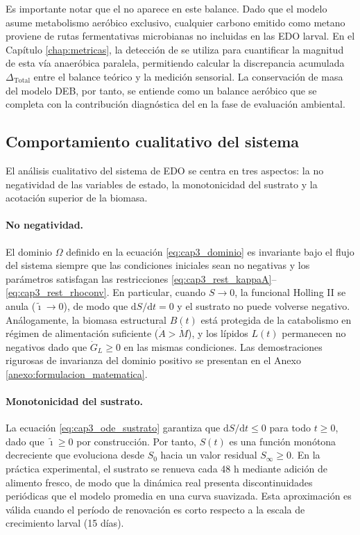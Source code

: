 Es importante notar que el  no aparece en este balance. Dado que el modelo asume metabolismo aeróbico exclusivo, cualquier carbono emitido como metano proviene de rutas fermentativas microbianas no incluidas en las EDO larval. En el Capítulo \ref{chap:metricas}, la detección de  se utiliza para cuantificar la magnitud de esta vía anaeróbica paralela, permitiendo calcular la discrepancia acumulada $\Delta_{\mathrm{Total}}$ entre el balance teórico y la medición sensorial. La conservación de masa del modelo DEB, por tanto, se entiende como un balance aeróbico que se completa con la contribución diagnóstica del  en la fase de evaluación ambiental.

\subsection{Comportamiento cualitativo del sistema}
\label{subsec:cap3_comportamiento}

El análisis cualitativo del sistema de EDO se centra en tres aspectos: la no negatividad de las variables de estado, la monotonicidad del sustrato y la acotación superior de la biomasa.

\paragraph{No negatividad.} El dominio $\Omega$ definido en la ecuación \eqref{eq:cap3_dominio} es invariante bajo el flujo del sistema siempre que las condiciones iniciales sean no negativas y los parámetros satisfagan las restricciones \eqref{eq:cap3_rest_kappaA}--\eqref{eq:cap3_rest_rhoconv}. En particular, cuando $S \to 0$, la funcional Holling II se anula ($\tilde{\imath} \to 0$), de modo que $\mathrm{d}S/\mathrm{d}t = 0$ y el sustrato no puede volverse negativo. Análogamente, la biomasa estructural $B(t)$ está protegida de la catabolismo en régimen de alimentación suficiente ($\dot{A} > \dot{M}$), y los lípidos $L(t)$ permanecen no negativos dado que $\dot{G}_L \geq 0$ en las mismas condiciones. Las demostraciones rigurosas de invarianza del dominio positivo se presentan en el Anexo \ref{anexo:formulacion_matematica}.

\paragraph{Monotonicidad del sustrato.} La ecuación \eqref{eq:cap3_ode_sustrato} garantiza que $\mathrm{d}S/\mathrm{d}t \leq 0$ para todo $t \geq 0$, dado que $\tilde{\imath} \geq 0$ por construcción. Por tanto, $S(t)$ es una función monótona decreciente que evoluciona desde $S_0$ hacia un valor residual $S_{\infty} \geq 0$. En la práctica experimental, el sustrato se renueva cada 48 h mediante adición de alimento fresco, de modo que la dinámica real presenta discontinuidades periódicas que el modelo promedia en una curva suavizada. Esta aproximación es válida cuando el período de renovación es corto respecto a la escala de crecimiento larval (15 días).

